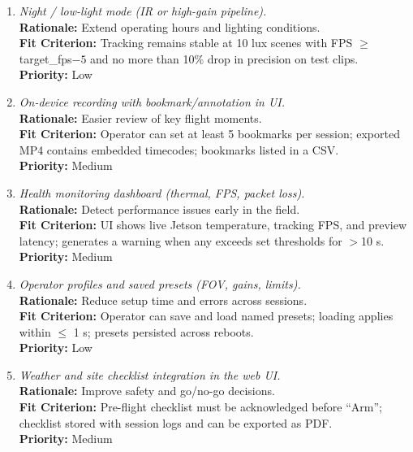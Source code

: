 \documentclass[12pt]{article}
\begin{document}
\begin{enumerate}[label=WTRM \arabic*., wide=0pt, leftmargin=*]
  \item \emph{Night / low-light mode (IR or high-gain pipeline).}\\[2mm]
        \textbf{Rationale:} Extend operating hours and lighting conditions.\\
        \textbf{Fit Criterion:} Tracking remains stable at 10 lux scenes with FPS $\geq$ target\_fps$-5$ and no more than 10\% drop in precision on test clips.\\
        \textbf{Priority:} Low

  \item \emph{On-device recording with bookmark/annotation in UI.}\\[2mm]
        \textbf{Rationale:} Easier review of key flight moments.\\
        \textbf{Fit Criterion:} Operator can set at least 5 bookmarks per session; exported MP4 contains embedded timecodes; bookmarks listed in a CSV.\\
        \textbf{Priority:} Medium

  \item \emph{Health monitoring dashboard (thermal, FPS, packet loss).}\\[2mm]
        \textbf{Rationale:} Detect performance issues early in the field.\\
        \textbf{Fit Criterion:} UI shows live Jetson temperature, tracking FPS, and preview latency; generates a warning when any exceeds set thresholds for $>$10 s.\\
        \textbf{Priority:} Medium

  \item \emph{Operator profiles and saved presets (FOV, gains, limits).}\\[2mm]
        \textbf{Rationale:} Reduce setup time and errors across sessions.\\
        \textbf{Fit Criterion:} Operator can save and load named presets; loading applies within $\leq$ 1 s; presets persisted across reboots.\\
        \textbf{Priority:} Low

  \item \emph{Weather and site checklist integration in the web UI.}\\[2mm]
        \textbf{Rationale:} Improve safety and go/no-go decisions.\\
        \textbf{Fit Criterion:} Pre-flight checklist must be acknowledged before “Arm”; checklist stored with session logs and can be exported as PDF.\\
        \textbf{Priority:} Medium


\end{enumerate}
\end{document}
